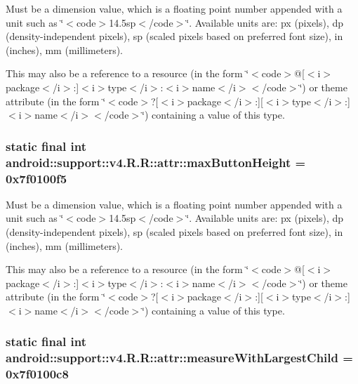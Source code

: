 Must be a dimension value, which is a floating point number appended with a unit such as \char`\"{}$<$code$>$14.5sp$<$/code$>$\char`\"{}. Available units are: px (pixels), dp (density-independent pixels), sp (scaled pixels based on preferred font size), in (inches), mm (millimeters). 

This may also be a reference to a resource (in the form \char`\"{}$<$code$>$@\mbox{[}$<$i$>$package$<$/i$>$:\mbox{]}$<$i$>$type$<$/i$>$:$<$i$>$name$<$/i$>$$<$/code$>$\char`\"{}) or theme attribute (in the form \char`\"{}$<$code$>$?\mbox{[}$<$i$>$package$<$/i$>$:\mbox{]}\mbox{[}$<$i$>$type$<$/i$>$:\mbox{]}$<$i$>$name$<$/i$>$$<$/code$>$\char`\"{}) containing a value of this type. \hypertarget{classandroid_1_1support_1_1v4_1_1_r_1_1attr_1460e67c329a3b769fe5964dfe20e80c}{
\subsubsection[{maxButtonHeight}]{\setlength{\rightskip}{0pt plus 5cm}static final int android::support::v4.R.R::attr::maxButtonHeight = 0x7f0100f5}}
\label{classandroid_1_1support_1_1v4_1_1_r_1_1attr_1460e67c329a3b769fe5964dfe20e80c}


Must be a dimension value, which is a floating point number appended with a unit such as \char`\"{}$<$code$>$14.5sp$<$/code$>$\char`\"{}. Available units are: px (pixels), dp (density-independent pixels), sp (scaled pixels based on preferred font size), in (inches), mm (millimeters). 

This may also be a reference to a resource (in the form \char`\"{}$<$code$>$@\mbox{[}$<$i$>$package$<$/i$>$:\mbox{]}$<$i$>$type$<$/i$>$:$<$i$>$name$<$/i$>$$<$/code$>$\char`\"{}) or theme attribute (in the form \char`\"{}$<$code$>$?\mbox{[}$<$i$>$package$<$/i$>$:\mbox{]}\mbox{[}$<$i$>$type$<$/i$>$:\mbox{]}$<$i$>$name$<$/i$>$$<$/code$>$\char`\"{}) containing a value of this type. \hypertarget{classandroid_1_1support_1_1v4_1_1_r_1_1attr_58bbf08cc2a8049acac48855a24082db}{
\subsubsection[{measureWithLargestChild}]{\setlength{\rightskip}{0pt plus 5cm}static final int android::support::v4.R.R::attr::measureWithLargestChild = 0x7f0100c8}}
\label{classandroid_1_1support_1_1v4_1_1_r_1_1attr_58bbf08cc2a8049acac48855a24082db}


